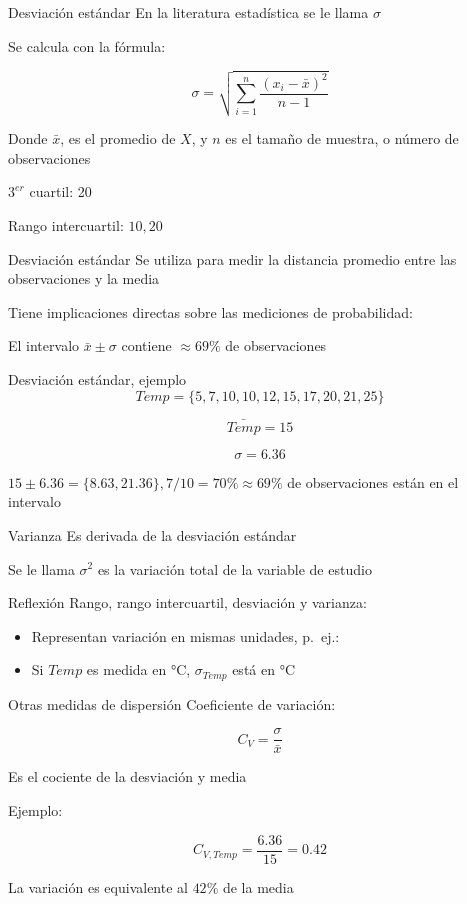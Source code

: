 \documentclass[
  11pt,
  ignorenonframetext,
]{beamer}
\begin{document}
\begin{frame}{Desviación estándar}
\protect\hypertarget{desviaciuxf3n-estuxe1ndar}{}
En la literatura estadística se le llama \(\sigma\)

Se calcula con la fórmula:

\[\sigma = \sqrt{\sum_{i = 1}^n \frac{(x_i - \bar{x})^2}{n-1}}\]

Donde \(\bar{x}\), es el promedio de \(X\), y \(n\) es el tamaño de
muestra, o número de observaciones

\(3^{er}\) cuartil: 20

Rango intercuartil: \(10, 20\)
\end{frame}

\begin{frame}{Desviación estándar}
\protect\hypertarget{desviaciuxf3n-estuxe1ndar-1}{}
Se utiliza para medir la distancia promedio entre las observaciones y la
media

Tiene implicaciones directas sobre las mediciones de probabilidad:

El intervalo \(\bar{x} \pm \sigma\) contiene \(\approx 69 \%\) de
observaciones
\end{frame}

\begin{frame}{Desviación estándar, ejemplo}
\protect\hypertarget{desviaciuxf3n-estuxe1ndar-ejemplo}{}
\[Temp = \{5, 7, 10, 10, 12, 15, 17, 20, 21, 25\}\]

\[\bar{Temp} = 15\]

\[\sigma = 6.36\]

\(15 \pm 6.36 = \{8.63, 21.36\}, 7/10= 70\% \approx 69 \%\) de
observaciones están en el intervalo
\end{frame}

\begin{frame}{Varianza}
\protect\hypertarget{varianza}{}
Es derivada de la desviación estándar

Se le llama \(\sigma^2\) es la variación total de la variable de estudio
\end{frame}

\begin{frame}{Reflexión}
\protect\hypertarget{reflexiuxf3n}{}
Rango, rango intercuartil, desviación y varianza:

\begin{itemize}
\item
  Representan variación en mismas unidades, p.~ej.:
\item
  Si \(Temp\) es medida en \(°\mathrm{C}\), \(\sigma_{Temp}\) está en
  \(°\mathrm{C}\)
\end{itemize}
\end{frame}

\begin{frame}{Otras medidas de dispersión}
\protect\hypertarget{otras-medidas-de-dispersiuxf3n}{}
Coeficiente de variación:

\[C_V = \frac{\sigma}{\bar{x}}\]

Es el cociente de la desviación y media

Ejemplo:

\[C_{V, Temp} = \frac{6.36}{15} = 0.42\]

La variación es equivalente al \(42 \%\) de la media
\end{frame}
\end{document}
